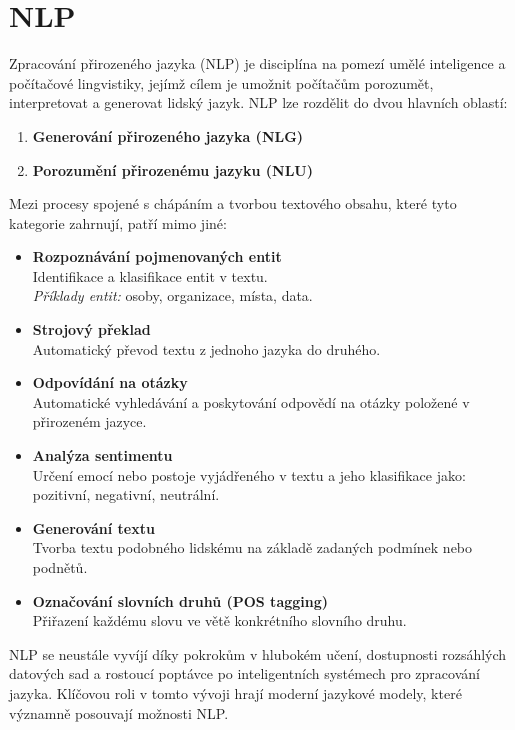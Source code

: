 \section{NLP}
Zpracování přirozeného jazyka (NLP) je disciplína na pomezí umělé inteligence a počítačové lingvistiky, jejímž cílem je umožnit počítačům porozumět, interpretovat a generovat lidský jazyk.
NLP lze rozdělit do dvou hlavních oblastí:
\begin{enumerate}
    \item \textbf{Generování přirozeného jazyka (NLG)} 
    \item \textbf{Porozumění přirozenému jazyku (NLU)} 
\end{enumerate}
Mezi procesy spojené s chápáním a tvorbou textového obsahu, které tyto kategorie zahrnují, patří mimo jiné:
\begin{itemize}  
    \item \textbf{Rozpoznávání pojmenovaných entit} \\
    Identifikace a klasifikace entit v textu. \\
    \textit{Příklady entit:} osoby, organizace, místa, data.
    
    \item \textbf{Strojový překlad} \\
    Automatický převod textu z jednoho jazyka do druhého.
    
    \item \textbf{Odpovídání na otázky} \\
    Automatické vyhledávání a poskytování odpovědí na otázky položené v přirozeném jazyce.
    
    \item \textbf{Analýza sentimentu} \\
    Určení emocí nebo postoje vyjádřeného v textu a jeho klasifikace jako: pozitivní, negativní, neutrální.
    
    \item \textbf{Generování textu} \\
    Tvorba textu podobného lidskému na základě zadaných podmínek nebo podnětů.
    
    \item \textbf{Označování slovních druhů (POS tagging)} \\
    Přiřazení každému slovu ve větě konkrétního slovního druhu. \cite{Kondurkar2023} \\
\end{itemize}

NLP se neustále vyvíjí díky pokrokům v hlubokém učení, dostupnosti rozsáhlých datových sad a rostoucí poptávce po inteligentních systémech pro zpracování jazyka.
Klíčovou roli v tomto vývoji hrají moderní jazykové modely, které významně posouvají možnosti NLP.

